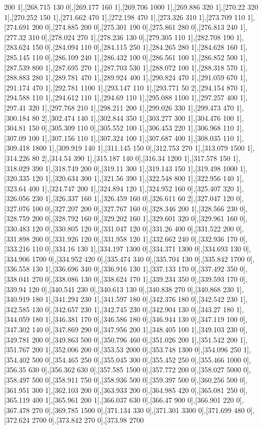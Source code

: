 {200 1],[268.715 130 0],[269.177 160 1],[269.706 1000 1],[269.886 320 1],[270.22 320 1],[270.252 150 1],[271.662 470 1],[272.198 470 1],[273.326 310 1],[273.709 110 1],[274.691 200 0],[274.885 200 0],[275.301 190 0],[275.861 280 0],[276.813 240 1],[277.32 310 0],[278.024 270 1],[278.236 130 0],[279.305 110 1],[282.708 190 1],[283.624 150 0],[284.094 110 0],[284.115 250 1],[284.265 280 1],[284.628 160 1],[285.145 110 0],[286.109 240 1],[286.432 100 0],[286.561 100 1],[286.852 500 1],[287.539 800 1],[287.695 270 1],[287.703 530 1],[288.072 100 1],[288.318 570 1],[288.883 280 1],[289.781 470 1],[289.924 400 1],[290.824 470 1],[291.059 670 1],[291.174 470 1],[292.781 1100 1],[293.147 110 1],[293.771 50 2],[294.154 870 1],[294.588 110 1],[294.612 110 1],[294.69 110 1],[295.088 1100 1],[297.257 400 1],[297.41 320 1],[297.768 210 1],[298.211 200 1],[299.026 330 1],[299.473 470 1],[300.184 80 2],[302.474 140 1],[302.844 350 1],[303.277 300 1],[304.476 100 1],[304.81 150 0],[305.309 110 0],[305.552 100 1],[306.453 220 1],[306.968 110 1],[307.09 100 1],[307.156 110 1],[307.324 100 1],[307.687 400 1],[308.035 110 1],[309.418 1800 1],[309.919 140 1],[311.145 150 0],[312.753 270 1],[313.079 1500 1],[314.226 80 2],[314.54 390 1],[315.187 140 0],[316.34 1200 1],[317.578 150 1],[318.029 390 1],[318.749 200 0],[319.11 300 1],[319.143 150 1],[319.498 1000 1],[320.335 120 1],[320.634 300 1],[321.56 390 1],[322.548 800 1],[322.956 140 1],[323.64 400 1],[324.747 200 1],[324.894 120 1],[324.952 160 0],[325.407 320 1],[326.056 230 1],[326.337 160 1],[326.459 160 0],[326.611 60 2],[327.047 120 0],[327.076 100 0],[327.207 200 0],[327.767 160 0],[328.346 200 1],[328.566 230 0],[328.759 200 0],[328.792 160 0],[329.202 160 1],[329.601 320 0],[329.961 160 0],[330.483 120 0],[330.805 120 0],[331.047 120 0],[331.26 400 0],[331.522 200 0],[331.898 200 0],[331.926 120 0],[331.958 120 1],[332.662 240 0],[332.936 170 0],[333.216 110 0],[334.16 130 1],[334.197 1300 0],[334.371 1300 0],[334.693 130 0],[334.906 1700 0],[334.952 420 0],[335.474 340 0],[335.704 130 0],[335.842 1700 0],[336.558 130 1],[336.696 340 0],[336.916 130 1],[337.133 170 0],[337.492 350 0],[338.041 270 0],[338.086 130 0],[338.624 170 1],[339.234 350 0],[339.593 170 0],[339.94 120 0],[340.541 230 0],[340.613 130 0],[340.838 270 0],[340.868 230 1],[340.919 180 1],[341.294 230 1],[341.597 180 0],[342.376 180 0],[342.542 230 1],[342.585 130 0],[342.657 230 1],[342.745 230 0],[342.904 130 0],[343.27 180 1],[344.059 180 1],[346.381 170 0],[346.586 180 0],[346.944 130 0],[347.119 100 0],[347.302 140 0],[347.869 290 0],[347.956 200 1],[348.405 100 1],[349.103 230 0],[349.781 200 0],[349.863 500 0],[350.796 460 0],[351.026 200 1],[351.542 200 1],[351.767 200 1],[352.006 200 0],[353.53 2000 0],[353.748 1300 0],[354.096 250 1],[354.402 500 0],[354.465 250 0],[355.045 300 0],[355.452 250 0],[355.466 1000 0],[356.35 630 0],[356.362 630 0],[357.585 1500 0],[357.772 200 0],[358.027 5000 0],[358.497 500 0],[358.911 750 0],[358.936 500 0],[359.397 500 0],[360.256 500 0],[361.951 300 1],[362.103 200 0],[363.933 200 0],[364.985 420 0],[365.081 250 0],[365.119 400 1],[365.961 200 1],[366.037 630 0],[366.47 900 0],[366.901 220 0],[367.478 270 0],[369.785 1500 0],[371.134 330 0],[371.301 3300 0],[371.699 480 0],[372.624 2700 0],[373.842 270 0],[373.98 2700 }
